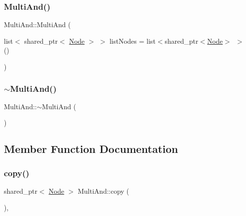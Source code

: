 \subsubsection{\texorpdfstring{Multi\+And()}{MultiAnd()}}
{\footnotesize\ttfamily Multi\+And\+::\+Multi\+And (\begin{DoxyParamCaption}\item[{list$<$ shared\+\_\+ptr$<$ \hyperlink{class_node}{Node} $>$ $>$}]{list\+Nodes = {\ttfamily list$<$shared\+\_\+ptr$<$\hyperlink{class_node}{Node}$>$~$>$()} }\end{DoxyParamCaption})\hspace{0.3cm}{\ttfamily [explicit]}}

\mbox{\label{class_multi_and_a2fe5c4c9809102fc779016d608e3f57d}} 
\subsubsection{\texorpdfstring{$\sim$\+Multi\+And()}{~MultiAnd()}}
{\footnotesize\ttfamily Multi\+And\+::$\sim$\+Multi\+And (\begin{DoxyParamCaption}{ }\end{DoxyParamCaption})\hspace{0.3cm}{\ttfamily [override]}}



\subsection{Member Function Documentation}
\mbox{\label{class_multi_and_ad89e8cb08fe1e0793e2e16e837992de2}} 
\subsubsection{\texorpdfstring{copy()}{copy()}}
{\footnotesize\ttfamily shared\+\_\+ptr$<$ \hyperlink{class_node}{Node} $>$ Multi\+And\+::copy (\begin{DoxyParamCaption}{ }\end{DoxyParamCaption})\hspace{0.3cm}{\ttfamily [override]}, {\ttfamily [virtual]}}



